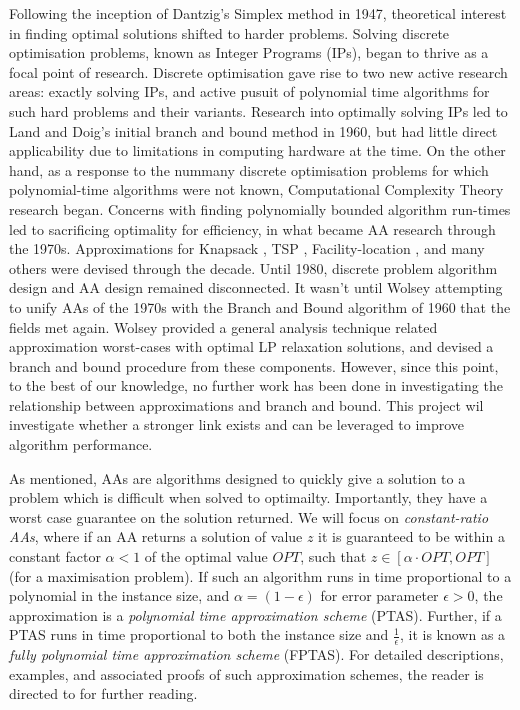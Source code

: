\documentclass[12pt, a4paper]{article}
\begin{document}
Following the inception of Dantzig's \cite{Dantzig} Simplex method in 1947, theoretical interest in finding optimal solutions shifted to harder problems. Solving discrete optimisation problems, known as Integer Programs (IPs), began to thrive as a focal point of research. Discrete optimisation gave rise to two new active research areas: exactly solving IPs, and active pusuit of polynomial time algorithms for such hard problems and their variants. Research into optimally solving IPs led to Land and Doig's initial branch and bound method \cite{LandDoig} in 1960, but had little direct applicability due to limitations in computing hardware at the time. On the other hand, as a response to the nummany discrete optimisation problems for which polynomial-time algorithms were not known, Computational Complexity Theory research began\cite{Cook}. Concerns with finding polynomially bounded algorithm run-times led to sacrificing optimality for efficiency, in what became AA research through the 1970s. Approximations for Knapsack \cite{IbarraKim}, TSP \cite{CristofidesTSP}, Facility-location \cite{CornuejolsFisherNemhauser}, and many others were devised through the decade. Until 1980, discrete problem algorithm design and AA design remained disconnected. It wasn't until Wolsey \cite{WOLSEY} attempting to unify AAs of the 1970s with the Branch and Bound algorithm of 1960 that the fields met again. Wolsey provided a general analysis technique related approximation worst-cases with optimal LP relaxation solutions, and devised a branch and bound procedure from these components. However, since this point, to the best of our knowledge, no further work has been done in investigating the relationship between approximations and branch and bound. This project wil investigate whether a stronger link exists and can be leveraged to improve algorithm performance. 

 As mentioned, AAs are algorithms designed to quickly give a solution to a problem which is difficult when solved to optimailty. Importantly, they have a worst case guarantee on the solution returned. We will focus on \emph{constant-ratio AAs}, where if an AA returns a solution of value $z$ it is guaranteed to be within a constant factor $\alpha < 1$ of the optimal value $OPT$, such that $z \in [\alpha \cdot OPT, OPT]$ (for a maximisation problem). If such an algorithm runs in time proportional to a polynomial in the instance size, and $\alpha = (1-\epsilon)$ for error parameter $\epsilon > 0$, the approximation is a \emph{polynomial time approximation scheme} (PTAS). Further, if a PTAS runs in time proportional to both the instance size and $\frac{1}{\epsilon}$, it is known as a \emph{fully polynomial time approximation scheme} (FPTAS). For detailed descriptions, examples, and associated proofs of such approximation schemes, the reader is directed to \cite{BOOK:2} for further reading.
\end{document}
